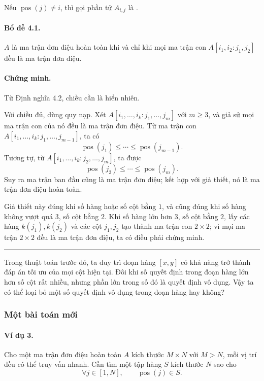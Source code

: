 \documentclass[11pt]{article}
\newcommand{\qedmark}{\hfill\rule{0.7ex}{0.7ex}}
\begin{document}
Nếu \(\operatorname{pos}(j)\ne i\), thì gọi phần tử \(A_{i,j}\) là
.

\paragraph{Bổ đề 4.1.}
\(A\) là ma trận đơn điệu hoàn toàn khi và chỉ khi mọi ma trận con
\(A[i_1,i_2:j_1,j_2]\) đều là ma trận đơn điệu.

\paragraph{Chứng minh.}
Từ Định nghĩa 4.2, chiều cần là hiển nhiên.

Với chiều đủ, dùng quy nạp. Xét
\(A[i_1,\ldots,i_k:j_1,\ldots,j_m]\) với \(m\ge 3\), và giả sử mọi ma trận con
của nó đều là ma trận đơn điệu. Từ ma trận con
\(A[i_1,\ldots,i_k:j_1,\ldots,j_{m-1}]\), ta có
\[
  \operatorname{pos}(j_1)\le\cdots\le \operatorname{pos}(j_{m-1}).
\]
Tương tự, từ \(A[i_1,\ldots,i_k:j_2,\ldots,j_m]\), ta được
\[
  \operatorname{pos}(j_2)\le\cdots\le \operatorname{pos}(j_m).
\]
Suy ra ma trận ban đầu cũng là ma trận đơn điệu; kết hợp với giả thiết, nó là
ma trận đơn điệu hoàn toàn.

Giả thiết này đúng khi số hàng hoặc số cột bằng \(1\), và cũng đúng khi số
hàng không vượt quá \(3\), số cột bằng \(2\). Khi số hàng lớn hơn \(3\), số cột
bằng \(2\), lấy các hàng \(k(j_1),k(j_2)\) và các cột \(j_1,j_2\) tạo thành
ma trận con \(2\times 2\); vì mọi ma trận \(2\times 2\) đều là ma trận đơn
điệu, ta có điều phải chứng minh. \qedmark

Trong thuật toán trước đó, ta duy trì đoạn hàng \([x,y]\) có khả năng trở
thành đáp án tối ưu của mọi cột hiện tại. Đôi khi số quyết định trong đoạn
hàng lớn hơn số cột rất nhiều, nhưng phần lớn trong số đó là quyết định vô
dụng. Vậy ta có thể loại bỏ một số quyết định vô dụng trong đoạn hàng hay
không?

\subsubsection{Một bài toán mới}

\paragraph{Ví dụ 3.}
Cho một ma trận đơn điệu hoàn toàn \(A\) kích thước \(M\times N\) với \(M>N\),
mỗi vị trí đều có thể truy vấn nhanh. Cần tìm một tập hàng \(S\) kích thước
\(N\) sao cho
\[
  \forall j\in[1,N],\qquad \operatorname{pos}(j)\in S.
\]
\end{document}
